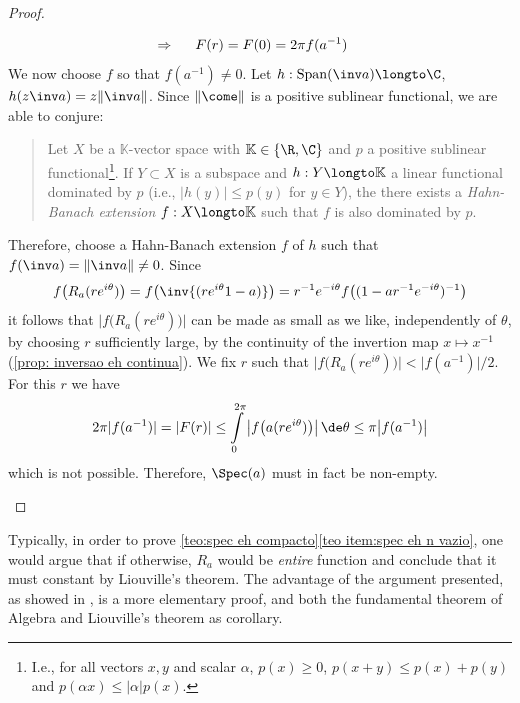 \begin{proof}
\begin{enumerate}[label=\ensuremath{(\roman*)}]
\[\begin{aligned}
\Rightarrow \hspace{0.5cm} F(r) &=F(0)=2 \pi f(a^{-1})
\end{aligned}
\]
We now choose $f$ so that $f\left(a^{-1}\right) \neq 0$. Let $h : \operatorname{Span}(\inv a) \longto \C$, $h(z\inv a) = z\|\inv a\|$. Since $\|\come\|$ is a positive sublinear functional, we are able to conjure: 
\begin{quote}
    \begin{invocacao}
        Let $X$ be a $\mathbb K$-vector space with $\mathbb K \in \{\R,\C\}$ and $p$ a positive sublinear functional\footnote{I.e., for all vectors $x,y$ and scalar $\alpha$, $p(x)\geq 0$, $p(x+y)\leq p(x)+p(y)$ and $p(\alpha x) \leq |\alpha|p(x)$.}. If $Y \subset X$ is a subspace and $h : Y \longto \mathbb K$ a linear functional dominated by $p$ (i.e., $|h(y)| \leq p(y)$ for $y\in Y$), the there exists a \textit{Hahn-Banach extension} $f: X \longto \mathbb K$ such that $f$ is also dominated by $p$. 
    \end{invocacao}
\end{quote}
Therefore, choose a Hahn-Banach extension $f$ of $h$ such that $f(\inv a) = \|\inv a\| \neq 0$. Since
$$
f\big(R_a(r e^{i \theta})\big)=f\big(\inv{(re^{i\theta}1-a)}\big) = r^{-1} e^{-i \theta} f\big((1-a r^{-1} e^{-i \theta})^{-1}\big)
$$
it follows that $\big|f\big(R_a(r e^{i \theta})\big)\big|$ can be made as small as we like, independently of $\theta$, by choosing $r$ sufficiently large, by the continuity of the invertion map $ x \longmapsto x^{-1}$ (\ref{prop: inversao eh continua}). We fix $r$ such that $\big|f\big(R_a(r e^{i \theta})\big)\big|<\big|f(a^{-1})\big| / 2$. For this $r$ we have
$$
2 \pi|f(a^{-1})|=|F(r)| \leq \int\limits_{0}^{2 \pi}\big|f\big(a(r e^{i \theta})\big)\big|\,\de\theta \leq \pi\big|f(a^{-1})\big|
$$
which is not possible. Therefore, $\Spec(a)$ must in fact be non-empty.
\end{enumerate}
\end{proof}

Typically, in order to prove \ref{teo:spec eh compacto}\ref{teo item:spec eh n vazio}, one would argue that if otherwise, $R_a$ would be \textit{entire} function and conclude that it must constant by Liouville's theorem. The advantage of the argument presented, as showed in \cite{singh2006spectrum}, is a more elementary proof, and both the fundamental theorem of Algebra and Liouville's theorem as corollary.

